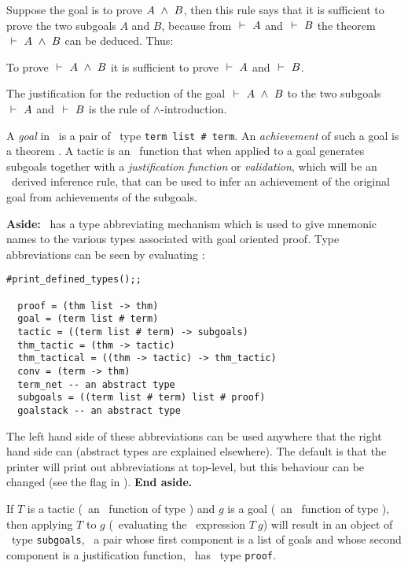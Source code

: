 Suppose the goal is to prove $A\ \wedge\  B$, then this rule says
that it is sufficient
to prove the two subgoals $A$ and $B$, because from $\ \vdash\  A$ and $\ \vdash\  B$
the theorem $\ \vdash\  A\ \wedge\  B$ can be deduced. Thus:

\begin{myenumerate}
\item To prove $\ \vdash\  A \ \wedge\  B$ it is sufficient to
      prove $\ \vdash\  A$ and $\ \vdash\  B$.
\item The justification for the reduction of the
goal  $\ \vdash\  A \ \wedge\  B$  to the two  subgoals  $\ \vdash\  A$
and $\ \vdash\  B$ is the rule of $\wedge$-introduction.
\end{myenumerate}

A {\it goal\/} in \HOL\ is a pair
 of \ML\ type
{\small\verb|term list # term|}. An {\it achievement\/} of such a goal
is a theorem
.
A tactic is an \ML\ function that when applied to a goal generates subgoals
together with a {\it justification function\/} or {\it validation\/},
which will be an \ML\ derived inference
rule, that can be used to infer an achievement of the original goal from
achievements
of the subgoals.



{\bf Aside:} \ML\ has a type abbreviating mechanism which is used to give mnemonic
names to the various types associated with goal oriented proof.  Type abbreviations
can be seen by evaluating :

\begin{session}\begin{verbatim}
#print_defined_types();;

  proof = (thm list -> thm)
  goal = (term list # term)
  tactic = ((term list # term) -> subgoals)
  thm_tactic = (thm -> tactic)
  thm_tactical = ((thm -> tactic) -> thm_tactic)
  conv = (term -> thm)
  term_net -- an abstract type
  subgoals = ((term list # term) list # proof)
  goalstack -- an abstract type
\end{verbatim}\end{session}

\noindent The left hand side of these abbreviations can be used anywhere that the
right hand side can (abstract types are explained elsewhere). The default is that
the printer will print out abbreviations at top-level, but this behaviour can
be changed (see the flag  in \DESCRIPTION).
{\bf End aside.}

If $T$ is a tactic (\ie\ an \ML\ function of type )  and $g$
is a goal (\ie\ an \ML\ function of type ), then
applying $T$ to $g$ (\ie\ evaluating the \ML\
expression $T\ g$) will result in
an object of \ML\ type {\small\verb|subgoals|}, \ie\ a pair whose
first component is a list of
goals and whose second component is a justification function, \ie\ has
\ML\ type {\small\verb|proof|}.


